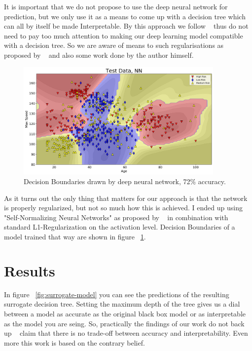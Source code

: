 \documentclass{article} %
\begin{document}
It is important that we do not propose to use the deep neural network for prediction, but we only use it as a means to come up with a decision tree which can all by itself be made Interpretable. By this approach we follow ~\citep{rudin2018stop} thus do not need to pay too much attention to making our deep learning model compatible with a decision tree. So we are aware of means to such regularisations as proposed by ~\citep{schaaf2019enhancing} and also some work done by the author himself. 

\begin{figure}[h]
\begin{center}
\includegraphics[width=4.0in]{nn.png}
\end{center}
\caption{Decision Boundaries drawn by deep neural network, 72\% accuracy.}
\label{fig:nn-decision-boundaries}
\end{figure}

As it turns out the only thing that matters for our approach is that the network is properly regularized, but not so much how this is achieved. I ended up using "Self-Normalizing Neural Networks" as proposed by ~\citep{klambauer2017selfnormalizing} in combination with standard L1-Regularization on the activation level. Decision Boundaries of a model trained that way are shown in figure ~\ref{fig:nn-decision-boundaries}.

\section{Results}

In figure ~\ref{fig:surrogate-model} you can see the predictions of the resulting surrogate decision tree. Setting the maximum depth of the tree gives us a dial between a model as accurate as the original black box model or as interpretable as the model you are seing. So, practically the findings of our work do not back up ~\citep{rudin2018stop} claim that there is no trade-off between accuracy and interpretability. Even more this work is based on the contrary belief. 
\end{document}
